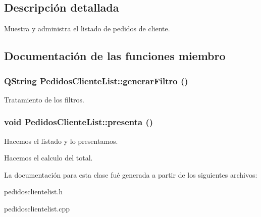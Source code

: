 \subsection{Descripci\'{o}n detallada}
Muestra y administra el listado de pedidos de cliente. 



\subsection{Documentaci\'{o}n de las funciones miembro}
\subsubsection{\setlength{\rightskip}{0pt plus 5cm}QString Pedidos\-Cliente\-List::generar\-Filtro ()}\label{classPedidosClienteList_a1}


Tratamiento de los filtros. 
\subsubsection{\setlength{\rightskip}{0pt plus 5cm}void Pedidos\-Cliente\-List::presenta ()}\label{classPedidosClienteList_a11}


Hacemos el listado y lo presentamos.

Hacemos el calculo del total. 

La documentaci\'{o}n para esta clase fu\'{e} generada a partir de los siguientes archivos:\begin{CompactItemize}
\item 
pedidosclientelist.h\item 
pedidosclientelist.cpp\end{CompactItemize}
